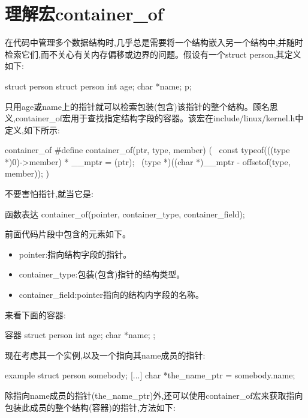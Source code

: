 \documentclass[lang=cn,newtx,10pt,scheme=chinese]{elegantbook}
\begin{document}
\section{理解宏container\_of}

在代码中管理多个数据结构时,几乎总是需要将一个结构嵌入另一个结构中,并随时检索它们,而不关心有关内存偏移或边界的问题。假设有一个struct person,其定义如下:

\begin{mycode}{struct person}
struct person {
    int age;
    char *name;
} p;
\end{mycode}

只用age或name上的指针就可以检索包装(包含)该指针的整个结构。顾名思义,container\_of宏用于查找指定结构字段的容器。该宏在include/linux/kernel.h中定义,如下所示:

\begin{mycode}{container\_of}
#define container_of(ptr, type, member) ({                  \
    const typeof(((type *)0)->member) * __mptr = (ptr);     \
    (type *)((char *)__mptr - offsetof(type, member)); })
\end{mycode}

不要害怕指针,就当它是:

\begin{mycode}{函数表达}
    container_of(pointer, container_type, container_field);
\end{mycode}

前面代码片段中包含的元素如下。

\begin{itemize}
    \item pointer:指向结构字段的指针。
    \item container\_type:包装(包含)指针的结构类型。
    \item container\_field:pointer指向的结构内字段的名称。
\end{itemize}

来看下面的容器:

\begin{mycode}{容器}
struct person {
    int age;
    char *name;
};
\end{mycode}

现在考虑其一个实例,以及一个指向其name成员的指针:

\begin{mycode}{example}
struct person somebody;
[...]
char *the_name_ptr = somebody.name;
\end{mycode}

除指向name成员的指针(the\_name\_ptr)外,还可以使用container\_of宏来获取指向包装此成员的整个结构(容器)的指针,方法如下:
\end{document}
